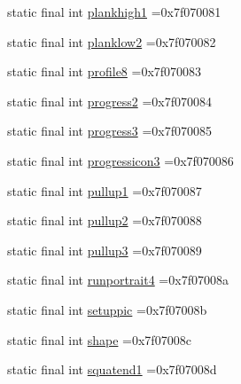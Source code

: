 \begin{DoxyCompactItemize}
\item 
static final int \mbox{\hyperlink{classcom_1_1example_1_1trainawearapplication_1_1_r_1_1drawable_a37dc3232a4075940daf3c0fc0dc5579a}{plankhigh1}} =0x7f070081
\item 
static final int \mbox{\hyperlink{classcom_1_1example_1_1trainawearapplication_1_1_r_1_1drawable_a6d445948ed0cf568a450dddb7e5443f4}{planklow2}} =0x7f070082
\item 
static final int \mbox{\hyperlink{classcom_1_1example_1_1trainawearapplication_1_1_r_1_1drawable_abba34824f47178b5ff3e3f460047c82e}{profile8}} =0x7f070083
\item 
static final int \mbox{\hyperlink{classcom_1_1example_1_1trainawearapplication_1_1_r_1_1drawable_a2753b28372b28899171fb374d4bc92d7}{progress2}} =0x7f070084
\item 
static final int \mbox{\hyperlink{classcom_1_1example_1_1trainawearapplication_1_1_r_1_1drawable_a2287f468d3245229672eaa56653bb83a}{progress3}} =0x7f070085
\item 
static final int \mbox{\hyperlink{classcom_1_1example_1_1trainawearapplication_1_1_r_1_1drawable_ae7c272be68be11611f0cbb2f85b3b74e}{progressicon3}} =0x7f070086
\item 
static final int \mbox{\hyperlink{classcom_1_1example_1_1trainawearapplication_1_1_r_1_1drawable_a853053c3e22294085cc95a16bb00c847}{pullup1}} =0x7f070087
\item 
static final int \mbox{\hyperlink{classcom_1_1example_1_1trainawearapplication_1_1_r_1_1drawable_a2c60afd17229d8a1990a00d6872f2805}{pullup2}} =0x7f070088
\item 
static final int \mbox{\hyperlink{classcom_1_1example_1_1trainawearapplication_1_1_r_1_1drawable_ae8e1fa4b48e3c6f41cba0279a183a639}{pullup3}} =0x7f070089
\item 
static final int \mbox{\hyperlink{classcom_1_1example_1_1trainawearapplication_1_1_r_1_1drawable_afd73b15c373a4142fea7c3a7d1f16710}{runportrait4}} =0x7f07008a
\item 
static final int \mbox{\hyperlink{classcom_1_1example_1_1trainawearapplication_1_1_r_1_1drawable_a555da9d51b6aa486c1ebe3339a9c2aef}{setuppic}} =0x7f07008b
\item 
static final int \mbox{\hyperlink{classcom_1_1example_1_1trainawearapplication_1_1_r_1_1drawable_ae7f0de2b2e47502cd465d91cdcb48f5a}{shape}} =0x7f07008c
\item 
static final int \mbox{\hyperlink{classcom_1_1example_1_1trainawearapplication_1_1_r_1_1drawable_a9099311d33fa787b9f07bbd02ec22fdc}{squatend1}} =0x7f07008d

\end{DoxyCompactItemize}
